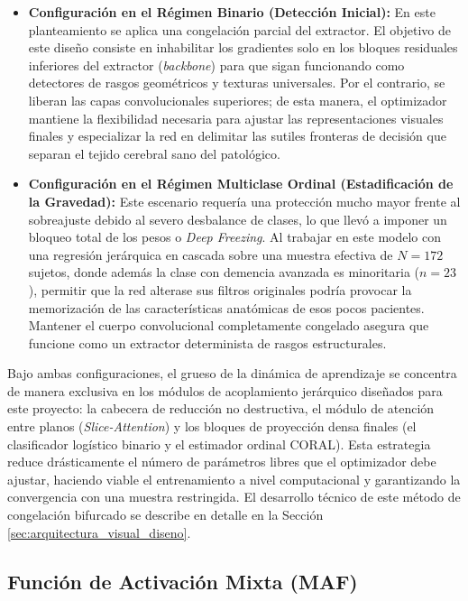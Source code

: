 \documentclass[12pt, oneside, english, spanish]{book}
\begin{document}
\begin{itemize}
	\item \textbf{Configuración en el Régimen Binario (Detección Inicial):} En este planteamiento se aplica una congelación parcial del extractor. El objetivo de este diseño consiste en inhabilitar los gradientes solo en los bloques residuales inferiores del extractor (\textit{backbone}) para que sigan funcionando como detectores de rasgos geométricos y texturas universales. Por el contrario, se liberan las capas convolucionales superiores; de esta manera, el optimizador mantiene la flexibilidad necesaria para ajustar las representaciones visuales finales y especializar la red en delimitar las sutiles fronteras de decisión que separan el tejido cerebral sano del patológico.
	
	\item \textbf{Configuración en el Régimen Multiclase Ordinal (Estadificación de la Gravedad):} Este escenario requería una protección mucho mayor frente al sobreajuste debido al severo desbalance de clases, lo que llevó a imponer un bloqueo total de los pesos o \textit{Deep Freezing}. Al trabajar en este modelo con una regresión jerárquica en cascada sobre una muestra efectiva de $N = 172$ sujetos, donde además la clase con demencia avanzada es minoritaria ($n = 23$), permitir que la red alterase sus filtros originales podría provocar la memorización de las características anatómicas de esos pocos pacientes. Mantener el cuerpo convolucional completamente congelado asegura que funcione como un extractor determinista de rasgos estructurales.
\end{itemize}

Bajo ambas configuraciones, el grueso de la dinámica de aprendizaje se concentra de manera exclusiva en los módulos de acoplamiento jerárquico diseñados para este proyecto: la cabecera de reducción no destructiva, el módulo de atención entre planos (\textit{Slice-Attention}) y los bloques de proyección densa finales (el clasificador logístico binario y el estimador ordinal CORAL). Esta estrategia reduce drásticamente el número de parámetros libres que el optimizador debe ajustar, haciendo viable el entrenamiento a nivel computacional y garantizando la convergencia con una muestra restringida. El desarrollo técnico de este método de congelación bifurcado se describe en detalle en la Sección \ref{sec:arquitectura_visual_diseno}.

\subsection{Función de Activación Mixta (MAF)} \label{subsec:maf_teoria}
\end{document}
